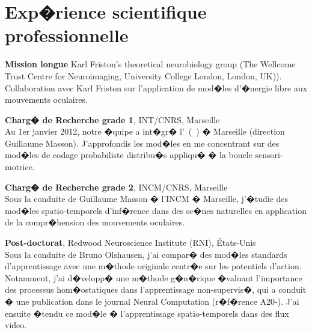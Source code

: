 \section{Exp�rience scientifique professionnelle}
\vspace*{.1cm}
\textbf{Mission longue}   Karl Friston's theoretical neurobiology group (The Wellcome Trust Centre for Neuroimaging, University College London, London, UK)). Collaboration avec Karl Friston sur l'application de mod�les d'�nergie libre aux mouvements oculaires.

	\textbf{Charg� de Recherche grade 1}, INT/CNRS, Marseille   \\
	 Au 1er janvier 2012, notre �quipe a int�gr� l'\Institute\ (\InstituteUMR\ ) �  Marseille (direction Guillaume Masson). J'approfondis les mod�les en me concentrant sur des mod�les de codage probabiliste distribu�s appliqu� � la boucle sensori-motrice.

	\textbf{Charg� de Recherche grade 2}, INCM/CNRS, Marseille   \\
	 Sous la conduite de Guillaume Masson �  l'INCM �  Marseille, j'�tudie des mod�les spatio-temporels d'inf�rence dans des sc�nes naturelles en application de la compr�hension des mouvements oculaires.

	\textbf{Post-doctorat}, Redwood Neuroscience Institute (RNI), \'Etats-Unis   \\	%
	 Sous la conduite de Bruno Olshausen, j'ai compar� des mod�les standards d'apprentissage avec une m�thode originale centr�e sur les potentiels d'action. Notamment, j'ai d�velopp� une m�thode g�n�rique �valuant l'importance des processus hom�ostatiques dans l'apprentissage non-supervis�, qui a conduit � une publication dans le journal Neural Computation (r�f�rence A20-\citep{Perrinet10shl}).   J'ai ensuite �tendu ce mod�le �  l'apprentissage spatio-temporels dans des flux video.

